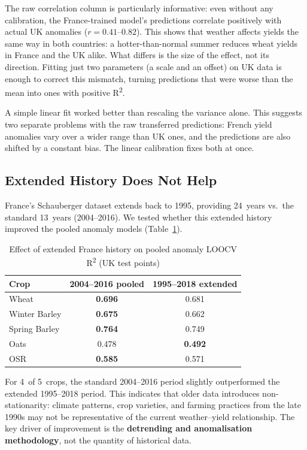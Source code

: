 \documentclass[12pt,a4paper]{report}
\newcommand{\rsq}{R\textsuperscript{2}}
\begin{document}
The raw correlation column is particularly informative: even without any calibration, the France-trained model's predictions correlate positively with actual UK anomalies ($r = 0.41$--$0.82$). This shows that weather affects yields the same way in both countries: a hotter-than-normal summer reduces wheat yields in France and the UK alike. What differs is the size of the effect, not its direction. Fitting just two parameters (a scale and an offset) on UK data is enough to correct this mismatch, turning predictions that were worse than the mean into ones with positive \rsq{}.

A simple linear fit worked better than rescaling the variance alone. This suggests two separate problems with the raw transferred predictions: French yield anomalies vary over a wider range than UK ones, and the predictions are also shifted by a constant bias. The linear calibration fixes both at once.

\subsection{Extended History Does Not Help}

France's Schauberger dataset extends back to 1995, providing 24~years vs.\ the standard 13~years (2004--2016). We tested whether this extended history improved the pooled anomaly models (Table~\ref{tab:extended_history}).

\begin{table}[H]
\centering
\caption{Effect of extended France history on pooled anomaly LOOCV \rsq{} (UK test points)}
\label{tab:extended_history}
\begin{tabular}{lcc}
\toprule
\textbf{Crop} & \textbf{2004--2016 pooled} & \textbf{1995--2018 extended} \\
\midrule
Wheat & \textbf{0.696} & 0.681 \\
Winter Barley & \textbf{0.675} & 0.662 \\
Spring Barley & \textbf{0.764} & 0.749 \\
Oats & 0.478 & \textbf{0.492} \\
OSR & \textbf{0.585} & 0.571 \\
\bottomrule
\end{tabular}
\end{table}

For 4~of 5~crops, the standard 2004--2016 period slightly outperformed the extended 1995--2018 period. This indicates that older data introduces non-stationarity: climate patterns, crop varieties, and farming practices from the late 1990s may not be representative of the current weather--yield relationship. The key driver of improvement is the \textbf{detrending and anomalisation methodology}, not the quantity of historical data.
\end{document}
